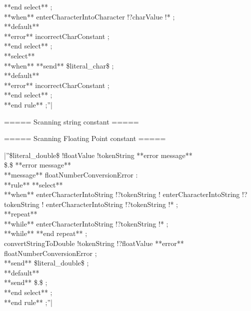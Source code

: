 {  **end select** ;\\ 
 **when** %
  enterCharacterIntoCharacter !?charValue !* ;\\ 
 **default**\\ 
  **error** incorrectCharConstant ;\\ 
 **end select** ;\\ 
 **select**\\ 
 **when** %
  **send** \$literal\_char\$ ;\\ 
 **default**\\ 
  **error** incorrectCharConstant ;\\ 
 **end select** ;\\ 
**end rule** ;''|

===== Scanning string constant =====

===== Scanning Floating Point constant =====

|''\$literal\_double\$ !floatValue !tokenString **error message** %
\\ 
\$.\$ **error message** %
\\ 
**message** floatNumberConversionError : %
\\ 
**rule** %
 **select**\\ 
 **when** %
  enterCharacterIntoString !?tokenString !%
  enterCharacterIntoString !?tokenString !%
  enterCharacterIntoString !?tokenString !* ;\\ 
  **repeat**\\ 
  **while** %
   enterCharacterIntoString !?tokenString !* ;\\ 
  **while** %
  **end repeat** ;\\ 
  convertStringToDouble !tokenString !?floatValue **error** floatNumberConversionError ;\\ 
  **send** \$literal\_double\$ ;\\ 
 **default**\\ 
  **send** \$.\$ ;\\ 
 **end select** ;\\
**end rule** ;''|

}
